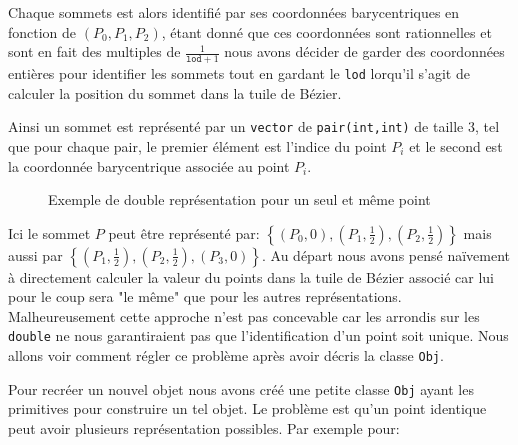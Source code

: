 \documentclass{article}
\begin{document}
Chaque sommets est alors identifié par ses coordonnées barycentriques en fonction de $(P_{0},P_{1},P_{2})$, étant donné que ces coordonnées sont rationnelles et sont en fait des multiples de $\frac{1}{\texttt{lod}+1}$ nous avons décider de garder des coordonnées entières pour identifier les sommets tout en gardant le \texttt{lod} lorqu'il s'agit de calculer la position du sommet dans la tuile de Bézier.

Ainsi un sommet est représenté par un \texttt{vector} de \texttt{pair(int,int)} de taille 3, tel que pour chaque pair, le premier élément est l'indice du point $P_{i}$ et le second est la coordonnée barycentrique associée au point $P_{i}$.
\begin{figure}[H]
\centering
{}
\caption{Exemple de double représentation pour un seul et même point}
\label{fig:doublerepr}
\end{figure}

Ici le sommet $P$ peut être représenté par: $\left\{(P_{0},0),(P_{1},\frac{1}{2}),(P_{2},\frac{1}{2})\right\}$ mais aussi par $\left\{(P_{1},\frac{1}{2}),(P_{2},\frac{1}{2}),(P_{3},0)\right\}$. Au départ nous avons pensé naïvement à directement calculer la valeur du points dans la tuile de Bézier associé car lui pour le coup sera "le même" que pour les autres représentations. Malheureusement cette approche n'est pas concevable car les arrondis sur les \texttt{double} ne nous garantiraient pas que l'identification d'un point soit unique. Nous allons voir comment régler ce problème après avoir décris la classe \texttt{Obj}.

Pour recréer un nouvel objet nous avons créé une petite classe \texttt{Obj} ayant les primitives pour construire un tel objet. Le problème est qu'un point identique peut avoir plusieurs représentation possibles. Par exemple pour:
\end{document}
